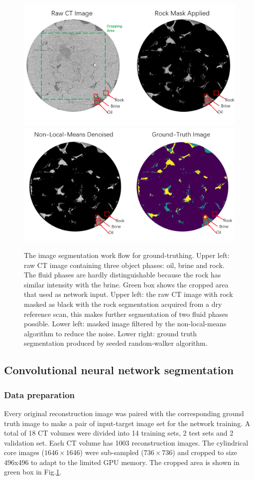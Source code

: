 \documentclass[draft,linenumbers]{agujournal2018}
\begin{document}
\begin{figure}[h]
\centering
\includegraphics[width=33pc]{imgs/raw-masked2.png}
\includegraphics[width=33pc]{imgs/nlm-gt2.png}
\caption{The image segmentation work flow for ground-truthing. Upper left: raw \textmu CT image containing three object phases: oil, brine and rock. The fluid phases are hardly distinguishable because the rock has similar intensity with the brine. Green box shows the cropped area that used as network input. Upper left: the raw \textmu CT image with rock masked as black with the rock segmentation acquired from a dry reference scan, this makes further segmentation of two fluid phases possible. Lower left: masked image filtered by the non-local-means algorithm to reduce the noise. Lower right: ground truth segmentation produced by seeded random-walker algorithm.}
\label{prep}
\end{figure}

\subsection{Convolutional neural network segmentation}
\subsubsection{Data preparation}
Every original reconstruction image was paired with the corresponding ground truth image to make a pair of input-target image set for the network training. A total of 18 \textmu CT volumes were divided into 14 training sets, 2 test sets and 2 validation set. Each \textmu CT volume has 1003 reconstruction images. The cylindrical core images ($1646\times1646$) were sub-sampled ($736\times736$) and cropped to size 496x496 to adapt to the limited GPU memory. The cropped area is shown in green box in Fig.\ref{prep}.
\end{document}
